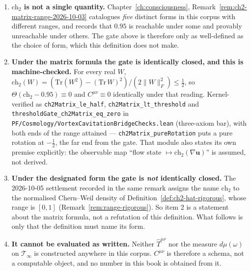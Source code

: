 \begin{enumerate}
\item \textbf{$\text{ch}_2$ is not a single quantity.} Chapter~\ref{ch:consciousness},
Remark~\ref{rem:ch2-matrix-range-2026-10-03} catalogues \emph{five} distinct
forms in this corpus with different ranges, and records that $0.95$ is
reachable under some and provably unreachable under others. The gate above is
therefore only as well-defined as the choice of form, which this definition
does not make.

\item \textbf{Under the matrix formula the gate is identically closed, and this
is machine-checked.} For every real $W$,
$\text{ch}_2(W) = (\mathrm{Tr}(W^2) - (\mathrm{Tr}\,W)^2)/(2\|W\|_F^2) \leq
\tfrac12$, so $\Theta(\text{ch}_2 - 0.95) \equiv 0$ and
$C^{\mu\nu} \equiv 0$ identically under that reading. Kernel-verified as
\texttt{ch2Matrix\_le\_half}, \texttt{ch2Matrix\_lt\_threshold} and
\texttt{thresholdGate\_ch2Matrix\_eq\_zero} in
\texttt{PF/Cosmology/VortexCavitationBridgeChecks.lean} (three-axiom bar), with
both ends of the range attained --- \texttt{ch2Matrix\_pureRotation} puts a
pure rotation at $-\tfrac12$, the far end from the gate. That module also
states its own premise explicitly: the observable map
``flow state $\mapsto \text{ch}_2(\nabla\mathbf{u})$'' is assumed, not derived.

\item \textbf{Under the designated form the gate is \emph{not} identically
closed.} The 2026-10-05 settlement recorded in the same remark assigns the name
$\text{ch}_2$ to the normalised Chern--Weil density of
Definition~\ref{def:ch2-hat-rigorous}, whose range is $[0,1]$
(Remark~\ref{rem:range-rigorous}). So item 2 is a statement about the matrix
formula, not a refutation of this definition. What follows is only that the
definition must name its form.

\item \textbf{It cannot be evaluated as written.} Neither $\hat{T}^{\mu\nu}$
nor the measure $d\mu(\omega)$ on $\mathcal{T}_\infty$ is constructed anywhere
in this corpus. $C^{\mu\nu}$ is therefore a schema, not a computable object,
and no number in this book is obtained from it.
\end{enumerate}

